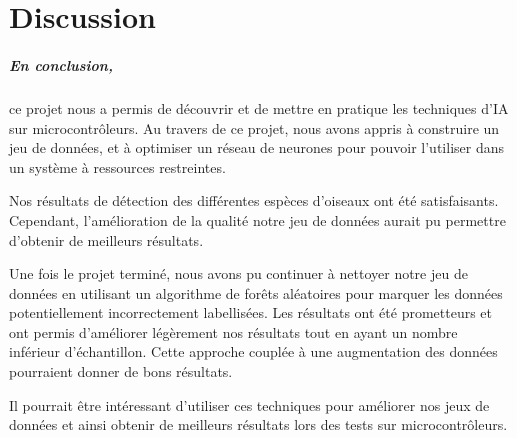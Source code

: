 \chapter{Discussion}

\paragraph{En conclusion,} ce projet nous a permis de découvrir et de mettre en pratique les techniques d'IA sur microcontrôleurs. 
Au travers de ce projet, nous avons appris à construire un jeu de données, 
et à optimiser un réseau de neurones pour pouvoir l'utiliser dans un système à ressources restreintes.

Nos résultats de détection des différentes espèces d'oiseaux ont été satisfaisants. Cependant, 
l'amélioration de la qualité notre jeu de données aurait pu permettre d'obtenir de meilleurs résultats.

Une fois le projet terminé, nous avons pu continuer à nettoyer notre jeu de données 
en utilisant un algorithme de forêts aléatoires pour marquer les données potentiellement incorrectement labellisées.
Les résultats ont été prometteurs et ont permis d'améliorer légèrement nos résultats tout en ayant
un nombre inférieur d'échantillon. Cette approche couplée à une augmentation des données 
pourraient donner de bons résultats.

Il pourrait être intéressant d'utiliser ces techniques pour améliorer nos jeux de données et ainsi obtenir
de meilleurs résultats lors des tests sur microcontrôleurs.

